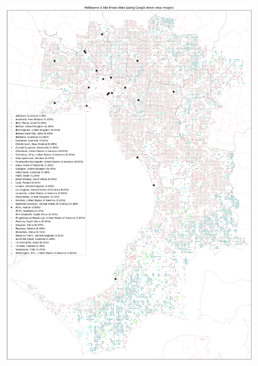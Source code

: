 \documentclass[sageh,times]{sagej}
\begin{document}
  

\begin{figure}[!htbp]
\centering    
\includegraphics[scale=0.15]{Images/MelbourneOverallAbrev_maps.png} 

\end{figure}
\end{document}
